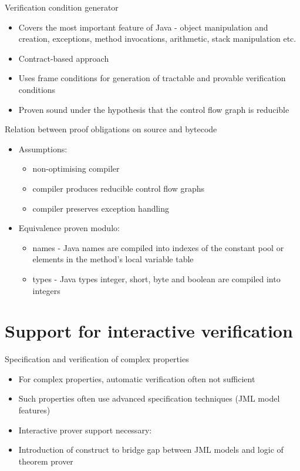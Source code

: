 \documentclass[final,nocolorBG,a4,mobius,nototal,pdf,slideColor]{prosper}
\begin{document}
\begin{slide}{Verification condition generator}
\begin{itemize}
 \item Covers the most important feature of 
 Java - object manipulation and creation, exceptions, 
method invocations, arithmetic, stack manipulation etc.
 
 \item Contract-based approach
 \item Uses frame conditions for generation of tractable and provable
verification conditions
 \item Proven sound under the hypothesis that the control flow graph is reducible
\end{itemize}
\end{slide}

 
\begin{slide}{Relation between proof obligations on source and bytecode}
\begin{itemize}
\item Assumptions:
 \begin{itemize}
 \item non-optimising compiler 
 \item compiler produces reducible control flow graphs
 \item compiler preserves exception handling
 \end{itemize}

\item Equivalence proven modulo:
 \begin{itemize}
 \item names - Java names are compiled into indexes of the constant pool or elements in the method's local variable table
 
 \item types - Java types integer, short, byte and boolean are
 compiled into integers
 
 \end{itemize}
\end{itemize}
\end{slide}

\part{Support for interactive verification}

\begin{slide}{Specification and verification of complex properties}
\begin{itemize}
\item For complex properties, automatic verification often not
sufficient 
\item Such properties often use advanced specification techniques
(JML model features)
\item Interactive prover support necessary: 
\item Introduction of  construct to bridge gap between
JML models and logic of theorem prover
\end{itemize}
\end{slide}
\end{document}
